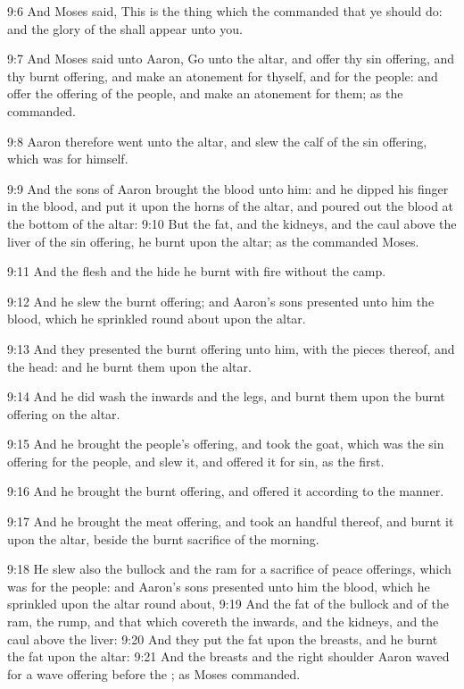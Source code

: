 9:6 And Moses said, This is the thing which the \LORD commanded that ye
should do: and the glory of the \LORD shall appear unto you.

9:7 And Moses said unto Aaron, Go unto the altar, and offer thy sin
offering, and thy burnt offering, and make an atonement for thyself,
and for the people: and offer the offering of the people, and make an
atonement for them; as the \LORD commanded.

9:8 Aaron therefore went unto the altar, and slew the calf of the sin
offering, which was for himself.

9:9 And the sons of Aaron brought the blood unto him: and he dipped
his finger in the blood, and put it upon the horns of the altar, and
poured out the blood at the bottom of the altar: 9:10 But the fat, and
the kidneys, and the caul above the liver of the sin offering, he
burnt upon the altar; as the \LORD commanded Moses.

9:11 And the flesh and the hide he burnt with fire without the camp.

9:12 And he slew the burnt offering; and Aaron's sons presented unto
him the blood, which he sprinkled round about upon the altar.

9:13 And they presented the burnt offering unto him, with the pieces
thereof, and the head: and he burnt them upon the altar.

9:14 And he did wash the inwards and the legs, and burnt them upon the
burnt offering on the altar.

9:15 And he brought the people's offering, and took the goat, which
was the sin offering for the people, and slew it, and offered it for
sin, as the first.

9:16 And he brought the burnt offering, and offered it according to
the manner.

9:17 And he brought the meat offering, and took an handful thereof,
and burnt it upon the altar, beside the burnt sacrifice of the
morning.

9:18 He slew also the bullock and the ram for a sacrifice of peace
offerings, which was for the people: and Aaron's sons presented unto
him the blood, which he sprinkled upon the altar round about, 9:19 And
the fat of the bullock and of the ram, the rump, and that which
covereth the inwards, and the kidneys, and the caul above the liver:
9:20 And they put the fat upon the breasts, and he burnt the fat upon
the altar: 9:21 And the breasts and the right shoulder Aaron waved for
a wave offering before the \LORD; as Moses commanded.

